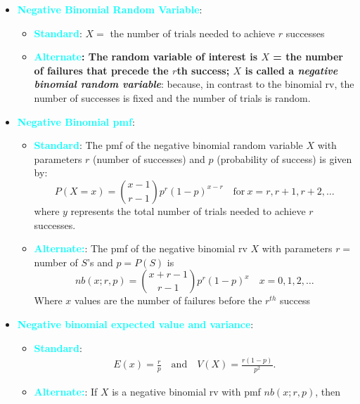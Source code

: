 \documentclass{report}
\begin{document}
\begin{itemize}
    \item \textbf{\textcolor{cyan}{Negative Binomial Random Variable}}:
        \begin{itemize}
            \item \textbf{\textcolor{cyan}{Standard}}: $X=$ the number of trials needed to achieve $r$ successes
            \item \textbf{\textcolor{cyan}{Alternate}: The random variable of interest is \( X \) = the number of failures that precede the \( r \)th success; \( X \) is called a \textit{negative binomial random variable}}: because, in contrast to the binomial rv, the number of successes is fixed and the number of trials is random.
        \end{itemize}
    \item \textbf{\textcolor{cyan}{Negative Binomial pmf}}: 
        \begin{itemize}
            \item \textbf{\textcolor{cyan}{Standard}}:
                The pmf of the negative binomial random variable \(X\) with parameters \(r\) (number of successes) and \(p\) (probability of success) is given by:
                \[
                    P(X = x) = \binom{x-1}{r-1} p^r (1-p)^{x-r} \quad \text{for} \ x = r, r+1, r+2, \ldots
                \]
                where \(y\) represents the total number of trials needed to achieve \(r\) successes.
            \item \textbf{\textcolor{cyan}{Alternate:}}: 
                The pmf of the negative binomial rv \( X \) with parameters \( r = \) number of \( S \)'s and \( p = P(S) \) is
                \[
                    nb(x; r, p) = \binom{x + r - 1}{r - 1} p^r (1 - p)^x \quad x = 0, 1, 2, \ldots
                \]
                Where $x$ values are the number of failures before the $r^{th}$ success
        \end{itemize}
    \item \textbf{\textcolor{cyan}{Negative binomial expected value and variance}}:
        \begin{itemize}
            \item \textbf{\textcolor{cyan}{Standard}}:
                \begin{align*}
                    E(x) = \frac{r}{p} \quad \text{and} \quad V(X) = \frac{r(1-p)}{p^{2}}
                .\end{align*}
            \item \textbf{\textcolor{cyan}{Alternate:}}:
            If \( X \) is a negative binomial rv with pmf \( nb(x; r, p) \), then

\end{itemize}
\end{itemize}
\end{document}
